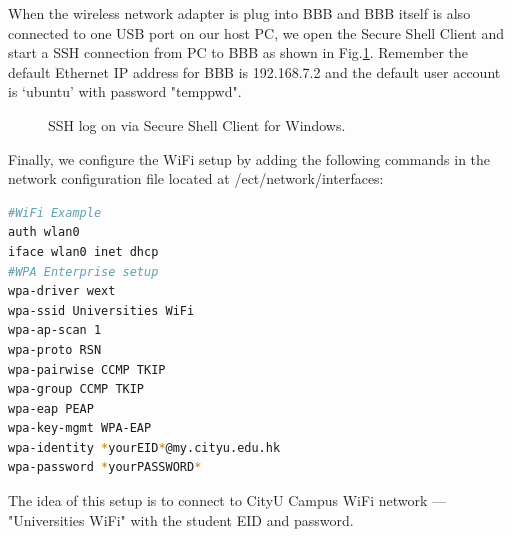 \documentclass[12pt,journal,draftclsnofoot,onecolumn]{IEEEtran}
\begin{document}
When the wireless network adapter is plug into BBB and BBB itself is also connected to one USB port on our host PC, we open the Secure Shell Client and start a SSH connection from PC to BBB as shown in Fig.\ref{ssh}. Remember the default Ethernet IP address for BBB is 192.168.7.2 and the default user account is `ubuntu' with password "temppwd".
\begin{figure}[htb]
	\centering

     \caption{SSH log on via Secure Shell Client for Windows.}\label{ssh}
     \end{figure}

Finally, we configure the WiFi setup by adding the following commands in the network configuration file located at /ect/network/interfaces:
\begin{lstlisting}[language={bash}]
#WiFi Example
auth wlan0
iface wlan0 inet dhcp
#WPA Enterprise setup
wpa-driver wext
wpa-ssid Universities WiFi
wpa-ap-scan 1
wpa-proto RSN
wpa-pairwise CCMP TKIP
wpa-group CCMP TKIP
wpa-eap PEAP
wpa-key-mgmt WPA-EAP
wpa-identity *yourEID*@my.cityu.edu.hk
wpa-password *yourPASSWORD*
\end{lstlisting}
The idea of this setup is to connect to CityU Campus WiFi network --- "Universities WiFi" with the student EID and password.
\end{document}
